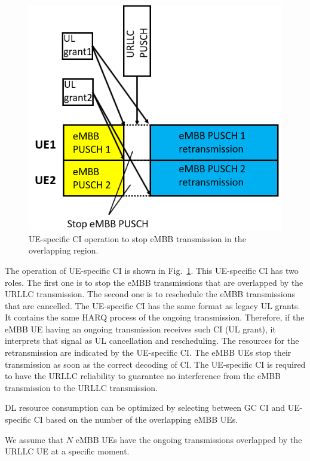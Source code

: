 \documentclass{ieeeaccess}
\begin{document}
\begin{figure}[htbp]
\centerline{\includegraphics[scale=0.4]{fig11.PNG}}
\caption{UE-specific CI operation to stop eMBB transmission in the overlapping region.}
\label{fig11}
\vspace{-2mm}
\end{figure}

The operation of UE-specific CI is shown in Fig.~\ref{fig11}. This UE-specific CI has two roles. The first one is to stop the eMBB transmissions that are overlapped by the URLLC transmission. The second one is to reschedule the eMBB transmissions that are cancelled. The UE-specific CI has the same format as legacy UL grants. It contains the same HARQ process of the ongoing transmission. Therefore, if the eMBB UE having an ongoing transmission receives such CI (UL grant), it interprets that signal as UL cancellation and rescheduling. The resources for the retransmission are indicated by the UE-specific CI. The eMBB UEs stop their transmission as soon as the correct decoding of CI. The UE-specific CI is required to have the URLLC reliability to guarantee no interference from the eMBB transmission to the URLLC transmission.

DL resource consumption can be optimized by selecting between GC CI and UE-specific CI based on the number of the overlapping eMBB UEs.

We assume that $N$ eMBB UEs have the ongoing transmissions overlapped by the URLLC UE at a specific moment. 
\end{document}
